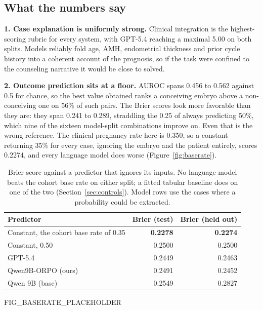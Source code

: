 \subsection{What the numbers say}

\textbf{1. Case explanation is uniformly strong.} Clinical integration is the
highest-scoring rubric for every system, with GPT-5.4 reaching a maximal 5.00 on
both splits. Models reliably fold age, AMH, endometrial thickness and prior cycle
history into a coherent account of the prognosis, so if the task were confined to
the counseling narrative it would be close to solved.

\textbf{2. Outcome prediction sits at a floor.} AUROC spans 0.456 to 0.562
against 0.5 for chance, so the best value obtained ranks a conceiving embryo
above a non-conceiving one on 56\% of such pairs. The Brier scores look more
favorable than they are: they span 0.241 to 0.289, straddling the 0.25 of always
predicting 50\%, which nine of the sixteen model-split combinations improve on.
Even that is the wrong reference. The clinical pregnancy rate here is 0.350, so a
constant returning 35\% for every case, ignoring the embryo and the patient
entirely, scores 0.2274, and every language model does worse
(Figure~\ref{fig:baserate}).

\begin{table}[H]
\centering
\small
\begin{tabular}{lrr}
\toprule
\textbf{Predictor} & \textbf{Brier (test)} & \textbf{Brier (held out)} \\
\midrule
Constant, the cohort base rate of 0.35 & \textbf{0.2278} & \textbf{0.2274} \\
Constant, 0.50 & 0.2500 & 0.2500 \\
\midrule
GPT-5.4 & 0.2449 & 0.2463 \\
Qwen9B-ORPO (ours) & 0.2491 & 0.2452 \\
Qwen 9B (base) & 0.2549 & 0.2827 \\
\bottomrule
\end{tabular}
\caption{Brier score against a predictor that ignores its inputs. No language
model beats the cohort base rate on either split; a fitted tabular baseline does
on one of the two (Section~\ref{sec:controls}). Model rows use the cases where a
probability could be extracted.}
\label{tab:baserate}
\end{table}

FIG_BASERATE_PLACEHOLDER


